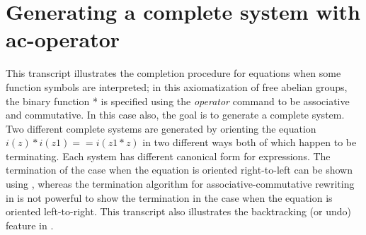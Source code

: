 \chapter{Generating a complete system with ac-operator}
\normalsize
\rm
This transcript illustrates the completion procedure for
equations when some function symbols are interpreted;
in this axiomatization of free abelian groups, the binary function
* is specified using the {\em operator} command to be associative and
commutative. In this case also, the goal is to generate
a complete system. Two different complete systems are generated
by orienting the equation $i(z) * i(z1) == i(z1 * z)$ in two
different ways both of which happen to be terminating.
Each system has different canonical form for expressions.
The termination of the case when the equation is oriented right-to-left
can be shown using \ERRL, whereas the termination
algorithm for associative-commutative rewriting in \RRL is not 
powerful to show the termination in the case
when the equation is oriented left-to-right.
This transcript also illustrates the backtracking (or undo) feature in
\ERRL.

